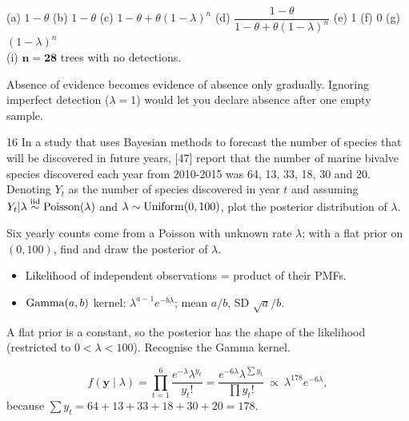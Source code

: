 \documentclass[11pt]{article}
\begin{document}
\begin{answer}
(a) $1-\theta$ \quad (b) $1-\theta$ \quad (c) $1-\theta+\theta(1-\lambda)^n$ \quad (d) $\dfrac{1-\theta}{1-\theta+\theta(1-\lambda)^n}$ \quad (e) 1 \quad (f) 0 \quad (g) $(1-\lambda)^n$\\
(i) $\mathbf{n=28}$ trees with no detections.
\end{answer}

\begin{takeaway}
Absence of evidence becomes evidence of absence only gradually. Ignoring imperfect detection ($\lambda=1$) would let you declare absence after one empty sample.
\end{takeaway}


\begin{problem}{16}
In a study that uses Bayesian methods to forecast the number of species that will be discovered in future years, [47] report that the number of marine bivalve species discovered each year from 2010-2015 was 64, 13, 33, 18, 30 and 20. Denoting $Y_t$ as the number of species discovered in year $t$ and assuming $Y_t|\lambda\stackrel{\text{iid}}{\sim}\mathrm{Poisson}(\lambda)$ and $\lambda\sim\mathrm{Uniform}(0,100)$, plot the posterior distribution of $\lambda$.
\end{problem}

\begin{restate}
Six yearly counts come from a Poisson with unknown rate $\lambda$; with a flat prior on $(0,100)$, find and draw the posterior of $\lambda$.
\end{restate}

\begin{recall}
\begin{itemize}
\item Likelihood of independent observations = product of their PMFs.
\item $\mathrm{Gamma}(a,b)$ kernel: $\lambda^{a-1}e^{-b\lambda}$; mean $a/b$, SD $\sqrt a/b$.
\end{itemize}
\end{recall}

\begin{keyidea}
A flat prior is a constant, so the posterior has the shape of the likelihood (restricted to $0<\lambda<100$). Recognise the Gamma kernel.
\end{keyidea}

\solution
{}
\[
f(\mathbf y\mid\lambda)=\prod_{t=1}^6\frac{e^{-\lambda}\lambda^{y_t}}{y_t!}=\frac{e^{-6\lambda}\lambda^{\sum y_t}}{\prod y_t!}\ \propto\ \lambda^{178}e^{-6\lambda},
\]
because $\sum y_t=64+13+33+18+30+20=178$.
\end{document}

